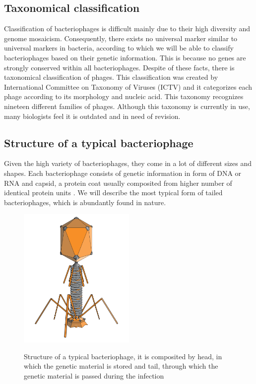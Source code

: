 
\subsection{Taxonomical classification}
Classification of bacteriophages is difficult mainly due to their high diversity and genome mosaicism. \cite{phagetax}
Consequently, there exists no universal marker similar to universal markers in bacteria, according to which we will be able to classify bacteriophages based on their genetic information.
This is because no genes are strongly conserved within all bacteriophages.
Despite of these facts, there is taxonomical classification of phages.
This classification was created by International Committee on Taxonomy of Viruses (ICTV) and it categorizes each phage according to its morphology and nucleic acid.
This taxonomy recognizes nineteen different families of phages.
Although this taxonomy is currently in use, many biologists feel it is outdated and in need of revision. \cite{phagetax}

\subsection{Structure of a typical bacteriophage}
Given the high variety of bacteriophages, they come in a lot of different sizes and shapes.
Each bacteriophage consists of genetic information in form of DNA or RNA and capsid, a protein coat usually composited from higher number of identical protein units \cite{phage_coat}.
We will describe the most typical form of tailed bacteriophages, which is abundantly found in nature.

\begin{figure}[h]
\includegraphics[width=0.5\textwidth]{./images/phage.png}
\centering
\cite{phage_pic}
\caption[Structure of a typical bacteriophage]{Structure of a typical bacteriophage, it is composited by head, in which the genetic material is stored and tail, through which the genetic material is passed during the infection 
}
\label{fig:phage}
\end{figure}



